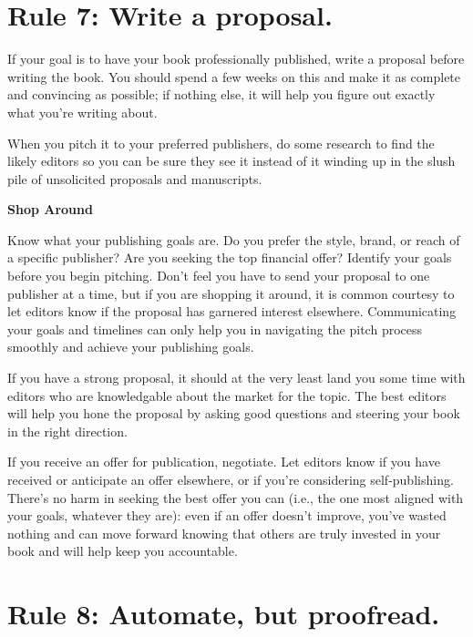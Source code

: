 \documentclass[10pt,letterpaper]{article}
\providecommand{\DIFaddend}{} %
\begin{document}
\DIFaddend \section*{Rule 7: Write a proposal.}

If your goal is to have your book professionally published, write a
proposal before writing the book. You should spend a few weeks on this
and make it as complete and convincing as possible; if nothing else, it
will help you figure out exactly what you're writing about.

When you pitch it to your preferred publishers, do some research to find
the likely editors so you can be sure they see it instead of it winding
up in the slush pile of unsolicited proposals and manuscripts.

\begin{mdframed}
\textbf{Shop Around}

\noindent
Know what your publishing goals are. Do you prefer the style, brand, or
reach of a specific publisher? Are you seeking the top financial offer?
Identify your goals before you begin pitching. Don't feel you have to
send your proposal to one publisher at a time, but if you are shopping
it around, it is common courtesy to let editors know if the proposal has
garnered interest elsewhere. Communicating your goals and timelines can
only help you in navigating the pitch process smoothly and achieve your
publishing goals.
\end{mdframed}

If you have a strong proposal, it should at the very least land you some
time with editors who are knowledgable about the market for the topic.
The best editors will help you hone the proposal by asking good
questions and steering your book in the right direction.

If you receive an offer for publication, negotiate. Let editors know
if you have received or anticipate an offer elsewhere, or if you're
considering self-publishing. There's no harm in seeking the best offer
you can (i.e., the one most aligned with your goals, whatever they
are): even if an offer doesn't improve, you've wasted nothing and can
move forward knowing that others are truly invested in your book and
will help keep you accountable.

\section*{Rule 8: Automate, but proofread.}
\end{document}
